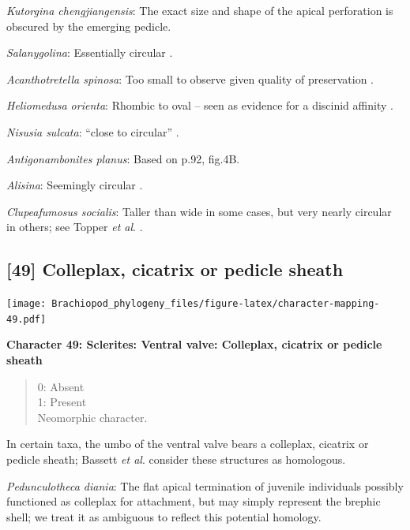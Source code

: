\documentclass[openany]{book}
\theoremstyle{definition}
\theoremstyle{definition}
\theoremstyle{definition}
\theoremstyle{remark}
\begin{document}
\emph{Kutorgina chengjiangensis}: The exact size and shape of the apical
perforation is obscured by the emerging pedicle.

\emph{Salanygolina}: Essentially circular \citep[fig.
4]{Holmer2009Theenigmatic}.

\emph{Acanthotretella spinosa}: Too small to observe given quality of
preservation \citep{Holmer2006Aspinose}.

\emph{Heliomedusa orienta}: Rhombic to oval -- seen as evidence for a
discinid affinity \citep{Chen2007Reinterpretationof}.

\emph{Nisusia sulcata}: ``close to circular''
\citep{Holmer2018Evolutionarysignificance}.

\emph{Antigonambonites planus}: Based on p.92, fig.4B.

\emph{Alisina}: Seemingly circular \citep{Zhang2011Anobolellate}.

\emph{Clupeafumosus socialis}: Taller than wide in some cases, but very
nearly circular in others; see Topper \emph{et al}.
\citeyearpar{Topper2013Reappraisalof}.

\hypertarget{colleplax-cicatrix-or-pedicle-sheath}{%
\subsection*{{[}49{]} Colleplax, cicatrix or pedicle
sheath}\label{colleplax-cicatrix-or-pedicle-sheath}}

\texttt{[image: Brachiopod\_phylogeny\_files/figure-latex/character-mapping-49.pdf]}

\textbf{Character 49: Sclerites: Ventral valve: Colleplax, cicatrix or
pedicle sheath}

\begin{quote}
0: Absent\\
1: Present\\
Neomorphic character.
\end{quote}

In certain taxa, the umbo of the ventral valve bears a colleplax,
cicatrix or pedicle sheath; Bassett \emph{et al}.
\citeyearpar{Bassett2008Earlyontogeny} consider these structures as
homologous.

\emph{Pedunculotheca diania}: The flat apical termination of juvenile
individuals possibly functioned as colleplax for attachment, but may
simply represent the brephic shell; we treat it as ambiguous to reflect
this potential homology.
\end{document}
